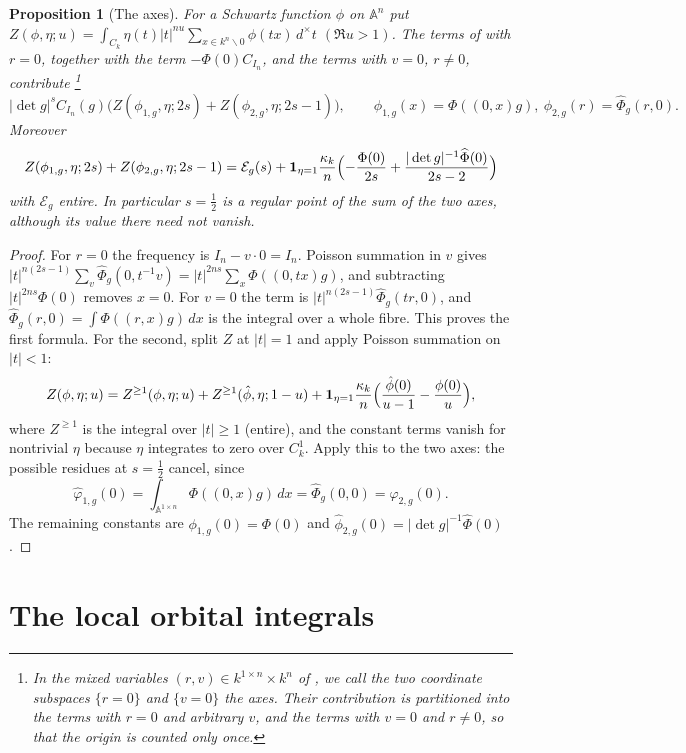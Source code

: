 \documentclass[11pt,oneside,notitlepage]{book}
\numberwithin{equation}{section}
\theoremstyle{plain}
\newtheorem{proposition}[theorem]{Proposition}
\theoremstyle{definition}
\newcommand{\A}{\mathbb{A}}
\newcommand{\one}{\mathbf{1}}
\begin{document}
\begin{proposition}[The axes]\label{prop:A-tate}
For a Schwartz function $\phi$ on $\A^n$ put $Z(\phi,\eta;u)=\int_{C_k}\eta(t)|t|^{nu}\sum_{x\in k^n\smallsetminus0}\phi(tx)\,d^\times t$ $(\Re u>1)$. The terms of  with $r=0$, together with the term $-\Phi(0)C_{I_n}$, and the terms with $v=0$, $r\neq0$, contribute \footnote{In the mixed variables $(r,v)\in k^{1\times n}\times k^n$ of , we call the two coordinate subspaces $\{r=0\}$ and	$\{v=0\}$ the axes. Their contribution is partitioned	into the terms with $r=0$ and arbitrary $v$, and the terms with $v=0$ and $r\ne0$, so that the origin is	counted only once.}
\[|\det g|^sC_{I_n}(g)\bigl(Z(\phi_{1,g},\eta;2s)+Z(\phi_{2,g},\eta;2s-1)\bigr),\qquad\phi_{1,g}(x)=\Phi((0,x)g),\ \phi_{2,g}(r)=\widehat\Phi_g(r,0).\]
Moreover
\[Z(\phi_{1,g},\eta;2s)+Z(\phi_{2,g},\eta;2s-1)=\mathcal E_g(s)+\one_{\eta=1}\frac{\kappa_k}n\Bigl(-\frac{\Phi(0)}{2s}+\frac{|\det g|^{-1}\widehat\Phi(0)}{2s-2}\Bigr)\]
with $\mathcal E_g$ entire. In particular $s=\frac12$ is a regular point of the sum of the two axes, although its value there need not vanish.
\end{proposition}
\begin{proof}
For $r=0$ the frequency is $I_n-v\cdot0=I_n$. Poisson summation in $v$ gives $|t|^{n(2s-1)}\sum_v\widehat\Phi_g(0,t^{-1}v)=|t|^{2ns}\sum_x\Phi((0,tx)g)$, and subtracting $|t|^{2ns}\Phi(0)$ removes $x=0$. For $v=0$ the term is $|t|^{n(2s-1)}\widehat\Phi_g(tr,0)$, and $\widehat\Phi_g(r,0)=\int\Phi((r,x)g)\,dx$ is the integral over a whole fibre. This proves the first formula. For the second, split $Z$ at $|t|=1$ and apply Poisson summation on $|t|<1$:
\[Z(\phi,\eta;u)=Z^{\ge1}(\phi,\eta;u)+Z^{\ge1}(\hat\phi,\eta;1-u)+\one_{\eta=1}\frac{\kappa_k}n\Bigl(\frac{\hat\phi(0)}{u-1}-\frac{\phi(0)}u\Bigr),\]
where $Z^{\ge1}$ is the integral over $|t|\ge1$ (entire), and the constant terms vanish for nontrivial $\eta$ because $\eta$ integrates to zero over $C_k^1$. Apply this to the two axes: the possible residues at $s=\frac12$ cancel, since
\[
\widehat\varphi_{1,g}(0)
=
\int_{\mathbb A^{1\times n}}\Phi((0,x)g)\,dx
=
\widehat\Phi_g(0,0)
=
\varphi_{2,g}(0).
\]
The remaining constants are $\phi_{1,g}(0)=\Phi(0)$ and $\hat\phi_{2,g}(0)=|\det g|^{-1}\widehat\Phi(0)$.
\end{proof}

\section{The local orbital integrals}
\end{document}
